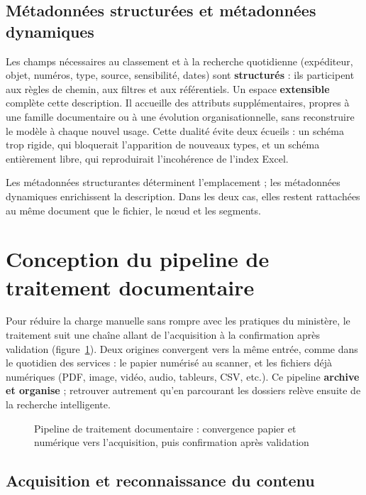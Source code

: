 \subsection{Métadonnées structurées et métadonnées dynamiques}

Les champs nécessaires au classement et à la recherche quotidienne (expéditeur, objet, numéros, type, source, sensibilité, dates) sont \textbf{structurés} : ils participent aux règles de chemin, aux filtres et aux référentiels. Un espace \textbf{extensible} complète cette description. Il accueille des attributs supplémentaires, propres à une famille documentaire ou à une évolution organisationnelle, sans reconstruire le modèle à chaque nouvel usage. Cette dualité évite deux écueils : un schéma trop rigide, qui bloquerait l'apparition de nouveaux types, et un schéma entièrement libre, qui reproduirait l'incohérence de l'index Excel.

Les métadonnées structurantes déterminent l'emplacement ; les métadonnées dynamiques enrichissent la description. Dans les deux cas, elles restent rattachées au même document que le fichier, le nœud et les segments.

\section{Conception du pipeline de traitement documentaire}

Pour réduire la charge manuelle sans rompre avec les pratiques du ministère, le traitement suit une chaîne allant de l'acquisition à la confirmation après validation (figure~\ref{fig:pipeline-conception}). Deux origines convergent vers la même entrée, comme dans le quotidien des services : le papier numérisé au scanner, et les fichiers déjà numériques (PDF, image, vidéo, audio, tableurs, CSV, etc.). Ce pipeline \textbf{archive et organise} ; retrouver autrement qu'en parcourant les dossiers relève ensuite de la recherche intelligente.

\begin{figure}[htbp]
\centering
\resizebox{\textwidth}{!}{}
\caption{Pipeline de traitement documentaire : convergence papier et numérique vers l'acquisition, puis confirmation après validation}
\label{fig:pipeline-conception}
\end{figure}

\subsection{Acquisition et reconnaissance du contenu}

